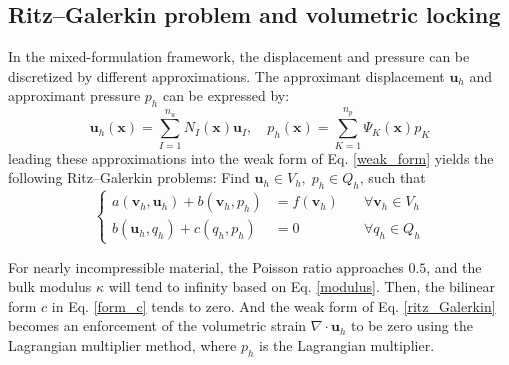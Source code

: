 \subsection{Ritz--Galerkin problem and volumetric locking}
In the mixed-formulation framework, the displacement and pressure can be discretized by different approximations. The approximant displacement $\boldsymbol{u}_h$ and approximant pressure $p_h$ can be expressed by:
\begin{equation}
\boldsymbol{u}_h(\boldsymbol{x}) = \sum_{I = 1}^{n_u} N_I(\boldsymbol{x}) \boldsymbol{u}_I, \quad
p_h(\boldsymbol{x}) = \sum_{K = 1}^{n_p} \Psi_K(\boldsymbol{x}) p_K
\end{equation}
leading these approximations into the weak form of Eq. \eqref{weak_form} yields the following Ritz--Galerkin problems:
Find $\boldsymbol{u}_h \in V_h, \; p_h \in Q_h$, such that
\begin{equation}\label{ritz_Galerkin}
\left\{
\begin{aligned}
a(\boldsymbol{v}_h, \boldsymbol{u}_h) + b(\boldsymbol{v}_h, p_h) &= f(\boldsymbol{v}_h) \quad &\forall \boldsymbol{v}_h \in V_h \\
b(\boldsymbol{u}_h, q_h) + c(q_h, p_h) &= 0 \quad &\forall q_h \in Q_h
\end{aligned}
\right.
\end{equation}

For nearly incompressible material, the Poisson ratio approaches $0.5$, and the bulk modulus $\kappa$ will tend to infinity based on Eq. \eqref{modulus}. Then, the bilinear form $c$ in Eq. \eqref{form_c} tends to zero. And the weak form of Eq. \eqref{ritz_Galerkin} becomes an enforcement of the volumetric strain $\nabla \cdot \boldsymbol{u}_h$ to be zero using the Lagrangian multiplier method, where $p_h$ is the Lagrangian multiplier.

